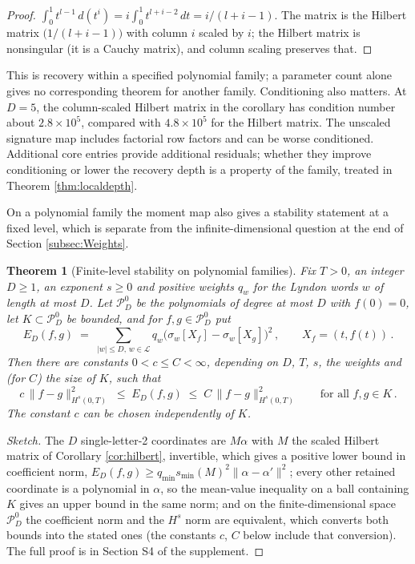 \documentclass[11pt,english]{article}
\newtheorem{theorem}{Theorem}
\theoremstyle{definition}
\theoremstyle{remark}
\begin{document}
\begin{proof}
$\int_{0}^{1}t^{l-1}\,d(t^{i})=i\int_{0}^{1}t^{l+i-2}\,dt=i/(l+i-1)$.
The matrix is the Hilbert matrix $\bigl(1/(l+i-1)\bigr)$ with column
$i$ scaled by $i$; the Hilbert matrix is nonsingular (it is a Cauchy
matrix), and column scaling preserves that.
\end{proof}


This is recovery within a specified polynomial family; a parameter
count alone gives no corresponding theorem for another family.
Conditioning also matters. At $D=5$, the column-scaled Hilbert matrix
in the corollary has condition number about $2.8\times10^5$, compared
with $4.8\times10^5$ for the Hilbert matrix. The unscaled signature
map includes factorial row factors and can be worse conditioned.
Additional core entries provide additional residuals; whether they
improve conditioning or lower the recovery depth is a property of the
family, treated in Theorem \ref{thm:localdepth}.

On a polynomial family the moment map also gives a stability
statement at a fixed level, which is separate from the infinite-dimensional question at the end of
Section \ref{subsec:Weights}.

\begin{theorem}[Finite-level stability on polynomial families]
\label{thm:polystab}
Fix $T>0$, an integer $D\geq1$, an exponent $s\geq0$ and positive
weights $q_{w}$ for the Lyndon words $w$ of length at most $D$. Let
$\mathcal{P}_{D}^{0}$ be the polynomials of degree at most $D$ with
$f(0)=0$, let $K\subset\mathcal{P}_{D}^{0}$ be bounded, and for
$f,g\in\mathcal{P}_{D}^{0}$ put
\[
E_{D}(f,g)\;=\;\sum_{|w|\leq D,\,w\in\mathcal{L}}q_{w}\bigl(\sigma_{w}[X_{f}]-\sigma_{w}[X_{g}]\bigr)^{2}\,,\qquad X_{f}=(t,f(t))\,.
\]
Then there are constants $0<c\leq C<\infty$, depending on $D$, $T$,
$s$, the weights and (for $C$) the size of $K$, such that
\[
c\,\|f-g\|_{H^{s}(0,T)}^{2}\;\leq\;E_{D}(f,g)\;\leq\;C\,\|f-g\|_{H^{s}(0,T)}^{2}\qquad\text{for all }f,g\in K\,.
\]
The constant $c$ can be chosen independently of $K$.
\end{theorem}

\begin{proof}[Sketch]
The $D$ single-letter-2 coordinates are $M\alpha$ with $M$ the scaled
Hilbert matrix of Corollary \ref{cor:hilbert}, invertible, which gives
a positive lower bound in coefficient norm,
$E_{D}(f,g)\geq q_{\min}s_{\min}(M)^{2}\|\alpha-\alpha'\|^{2}$; every
other retained coordinate is a polynomial in $\alpha$, so the
mean-value inequality on a ball containing $K$ gives an upper bound in
the same norm; and on the finite-dimensional space
$\mathcal{P}_{D}^{0}$ the coefficient norm and the $H^{s}$ norm are
equivalent, which converts both bounds into the stated ones (the
constants $c$, $C$ below include that conversion). The full proof is
in Section S4 of the supplement.
\end{proof}
\end{document}
